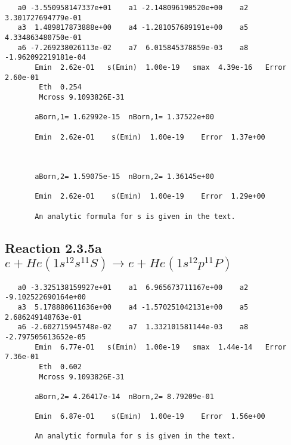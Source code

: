 \documentclass[12pt,dvipdfmx]{article}
\begin{document}
\begin{small}\begin{verbatim}
   a0 -3.550958147337e+01    a1 -2.148096190520e+00    a2  3.301727694779e-01
   a3  1.489817873888e+00    a4 -1.281057689191e+00    a5  4.334863480750e-01
   a6 -7.269238026113e-02    a7  6.015845378859e-03    a8 -1.962092219181e-04
       Emin  2.62e-01   s(Emin)  1.00e-19   smax  4.39e-16   Error  2.60e-01
        Eth  0.254
        Mcross 9.1093826E-31

       aBorn,1= 1.62992e-15  nBorn,1= 1.37522e+00

       Emin  2.62e-01    s(Emin)  1.00e-19    Error  1.37e+00



       aBorn,2= 1.59075e-15  nBorn,2= 1.36145e+00

       Emin  2.62e-01    s(Emin)  1.00e-19    Error  1.29e+00

       An analytic formula for s is given in the text.
\end{verbatim}\end{small}







\newpage
\subsection{
Reaction 2.3.5a $   e + He(1s^12s^11S) \rightarrow e + He(1s^12p^11P)$}





\begin{small}\begin{verbatim}
   a0 -3.325138159927e+01    a1  6.965673711167e+00    a2 -9.102522690164e+00
   a3  5.178880611636e+00    a4 -1.570251042131e+00    a5  2.686249148763e-01
   a6 -2.602715945748e-02    a7  1.332101581144e-03    a8 -2.797505613652e-05
       Emin  6.77e-01   s(Emin)  1.00e-19   smax  1.44e-14   Error  7.36e-01
        Eth  0.602
        Mcross 9.1093826E-31

       aBorn,2= 4.26417e-14  nBorn,2= 8.79209e-01

       Emin  6.87e-01    s(Emin)  1.00e-19    Error  1.56e+00

       An analytic formula for s is given in the text.
\end{verbatim}\end{small}




\newpage
\end{document}
